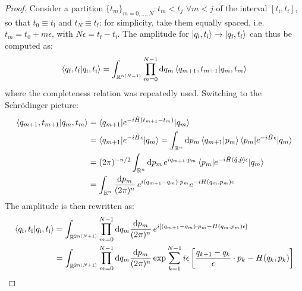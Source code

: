 \begin{proofbox}
  \begin{proof}
    Consider a partition $ \{t_m\}_{m = 0, \dots, N} : t_m < t_j \,\,\forall m < j $ of the interval $ [t_\text{i} , t_\text{f}] $, so that $ t_0 \equiv t_\text{i} $ and $ t_N \equiv t_\text{f} $: for simplicity, take them equally spaced, i.e. $ t_m = t_0 + m \epsilon $, with $ N \epsilon = t_\text{f} - t_\text{i} $. The amplitude for $ \ket{q_\text{i},t_\text{i}} \rightarrow \ket{q_\text{f},t_\text{f}} $ can thus be computed as:
    \begin{equation*}
      \begin{split}
        \braket{q_\text{f},t_\text{f} | q_\text{i},t_\text{i}} = \int_{\mathbb{R}^{n(N-1)}} \prod_{m = 0}^{N-1} \mathrm{d} q_m \braket{q_{m+1} , t_{m+1} | q_m , t_m}
      \end{split}
    \end{equation*}
    where the completeness relation was repeatedly used. Switching to the Schrödinger picture:
    \begin{equation*}
      \begin{split}
        \braket{q_{m+1} , t_{m+1} | q_m , t_m}
        & = \braket{q_{m+1} | e^{-i \hat H (t_{m+1} - t_m)} | q_m} \\
        & = \braket{q_{m+1} | e^{-i \hat H \epsilon} | q_m} = \int_{\mathbb{R}^n} \mathrm{d} p_m \braket{q_{m+1} | p_m} \braket{p_m | e^{-i \hat H \epsilon} | q_m} \\
        & = (2\pi)^{-n/2} \int_{\mathbb{R}^n} \mathrm{d} p_m\, e^{i q_{m+1} \cdot p_m} \braket{p_m | e^{-i \hat{H}(\hat{q},\hat{p}) \epsilon} | q_m} \\
        & = \int_{\mathbb{R}^n} \frac{\mathrm{d} p_m}{(2\pi)^n} \, e^{i (q_{m+1} - q_m) \cdot p_m} e^{-i H(q_m,p_m) \epsilon}
      \end{split}
    \end{equation*}
    The amplitude is then rewritten as:
    \begin{equation*}
      \begin{split}
        \braket{q_\text{f},t_\text{f} | q_\text{i},t_\text{i}}
        & = \int_{\R^{2n(N+1)}} \prod_{m = 0}^{N-1} \dd q_m \frac{\dd p_m}{(2\pi)^n} \, e^{i \left[ (q_{m+1} - q_m) \cdot p_m - H(q_m,p_m) \epsilon \right]} \\
        & = \int_{\R^{2n(N+1)}} \prod_{m = 0}^{N-1} \dd q_m \frac{\dd p_m}{(2\pi)^n} \exp \sum_{k = 1}^{N-1} i \epsilon \left[ \frac{q_{k+1} - q_k}{\epsilon} \cdot p_k - H(q_k,p_k) \right] \\
      \end{split}

\end{equation*}
\end{proof}
\end{proofbox}

